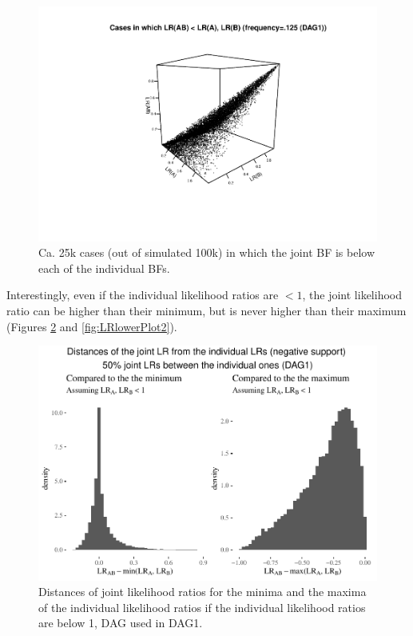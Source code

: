 \documentclass[
  10pt,
  dvipsnames,enabledeprecatedfontcommands]{scrartcl}
\begin{document}
\begin{figure}

\begin{center}\includegraphics[width=1\linewidth]{conjunction-appendix9_files/figure-latex/unnamed-chunk-10-1} \end{center}
\caption{Ca. 25k cases (out of simulated 100k) in which the joint BF is below each of the individual BFs.}
\label{fig:LRfails}
\end{figure}

Interestingly, even if the individual likelihood ratios are \(<1\), the
joint likelihood ratio can be higher than their minimum, but is never
higher than their maximum (Figures \ref{fig:LRlowerPlot} and
\ref{fig:LRlowerPlot2}).

\vspace{1mm}
\footnotesize

\normalsize

\begin{figure}


\begin{center}\includegraphics[width=1\linewidth]{conjunction-appendix9_files/figure-latex/unnamed-chunk-12-1} \end{center}

\caption{Distances of joint likelihood ratios for the minima and the maxima of the individual likelihood ratios if the individual likelihood ratios are below 1, DAG used in \textsf{DAG1}.} 
\label{fig:LRlowerPlot}
\end{figure}
\end{document}
